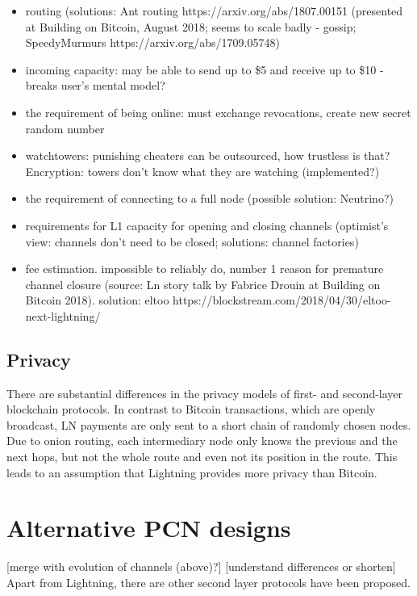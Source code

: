 \begin{itemize}
    \item routing (solutions: Ant routing https://arxiv.org/abs/1807.00151 (presented at Building on Bitcoin, August 2018; seems to scale badly - gossip; SpeedyMurmurs https://arxiv.org/abs/1709.05748)
    \item incoming capacity: may be able to send up to \$5 and receive up to \$10 - breaks user's mental model?
    \item the requirement of being online: must exchange revocations, create new secret random number
    \item watchtowers: punishing cheaters can be outsourced, how trustless is that? Encryption: towers don't know what they are watching (implemented?)
    \item the requirement of connecting to a full node (possible solution: Neutrino?)
    \item requirements for L1 capacity for opening and closing channels (optimist's view: channels don't need to be closed; solutions: channel factories)
    \item fee estimation. impossible to reliably do, number 1 reason for premature channel closure (source: Ln story talk by Fabrice Drouin at Building on Bitcoin 2018). solution: eltoo https://blockstream.com/2018/04/30/eltoo-next-lightning/
\end{itemize}

\subsection{Privacy}

There are substantial differences in the privacy models of first- and second-layer blockchain protocols.
In contrast to Bitcoin transactions, which are openly broadcast, LN payments are only sent to a short chain of randomly chosen nodes.
Due to onion routing, each intermediary node only knows the previous and the next hops, but not the whole route and even not its position in the route.
This leads to an assumption that Lightning provides more privacy than Bitcoin.


\section{Alternative PCN designs}

[merge with evolution of channels (above)?]
[understand differences or shorten]
Apart from Lightning, there are other second layer protocols have been proposed.

